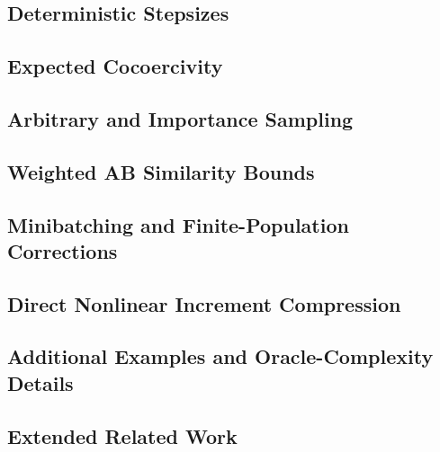 \subsection{Deterministic Stepsizes}
\mbox{}\par

\subsection{Expected Cocoercivity}
\mbox{}\par

\subsection{Arbitrary and Importance Sampling}
\mbox{}\par

\subsection{Weighted AB Similarity Bounds}
\mbox{}\par

\subsection{Minibatching and Finite-Population Corrections}
\mbox{}\par

\subsection{Direct Nonlinear Increment Compression}
\mbox{}\par

\subsection{Additional Examples and Oracle-Complexity Details}
\mbox{}\par

\subsection{Extended Related Work}
\mbox{}\par
